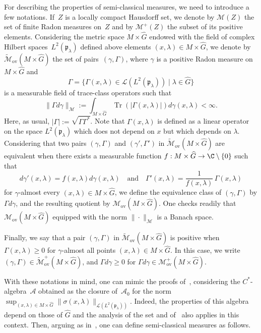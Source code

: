 \documentclass[JEP,XML,SOM,Unicode,published]{cedram}
\let\mathcal\mathscr
\let\sep\mid
\newcommand{\rov}{\mathrm{ov}}
\DeclareMathOperator{\Tr}{Tr}
\theoremstyle{plain}
\theoremstyle{definition}
\begin{document}
For describing the properties of semi-classical measures, we need to introduce a few notations.
If~$Z$ is a locally compact Hausdorff set, we denote by ${\mathcal M}(Z)$ the set of finite Radon measures on~$Z$ and by ${\mathcal M}^+(Z)$ the subset of its positive elements. Considering the metric space
$M\times \widehat G$ endowed with the field of complex Hilbert spaces~$L^2(\mathfrak p_\lambda)$ defined above elements $(x,\lambda)\in M\times \widehat G$, we denote by
$ \widetilde{\mathcal M}_{\rov}(M\times \widehat G) $
the set of pairs~$(\gamma,\Gamma)$, where $\gamma$ is a positive Radon measure on~$M\times \widehat G$ and
\[
\Gamma=\{\Gamma(x,\lambda)\in {\mathcal L}(L^2(\mathfrak p_\lambda))\sep\lambda \in \widehat G\}
\]
is a measurable field of trace-class operators
such that
\[
\|\Gamma d \gamma\|_{\mathcal M}:=
\int_{M\times \widehat G}\Tr(
|\Gamma(x,\lambda)|)d\gamma(x,\lambda)
<\infty.
\]
Here, as usual, $|\Gamma|:=\sqrt{\Gamma\Gamma^*}$. Note that $\Gamma(x,\lambda)$ is defined as a linear operator on the space $L^2(\mathfrak p_\lambda)$ which does not depend on $x$ but which depends on $\lambda$. Considering that 	
two pairs $(\gamma,\Gamma)$ and $(\gamma',\Gamma')$
in $\widetilde {\mathcal M}_{\rov}(M\times \widehat G)$
are {equivalent} when there exists a measurable function $f:M\times \widehat G\to \C\setminus\{0\}$ such that
\[
d\gamma'(x,\lambda) =f(x,\lambda) d\gamma(x,\lambda)\quad \text{and} \quad \Gamma'(x,\lambda)=\frac 1 {f(x,\lambda)}\, \Gamma(x,\lambda)
\]
for $\gamma$-almost every $(x,\lambda)\in M\times \widehat G $, we define the equivalence class of $(\gamma,\Gamma)$ by $\Gamma d \gamma$,
and the resulting quotient by ${\mathcal M}_{\rov}(M\times \widehat G)$. One checks readily that $\mathcal M_{\rov} (M\times\widehat G)$ equipped with the norm $\| \cdot\|_{{\mathcal M}}$ is a Banach space.

Finally, we say that
a pair $(\gamma,\Gamma)$
in $ \widetilde {\mathcal M}_{\rov}(M\times \widehat G)$
is positive when
$\Gamma(x,\lambda)\geq 0$ for $\gamma$-almost all points $(x,\lambda)\in M\times \widehat G$.
In this case, we write $(\gamma,\Gamma)\in \widetilde {\mathcal M}_{\rov}^+(M\times \widehat G)$,
and $\Gamma d\gamma \geq 0$ for $\Gamma d\gamma \in {\mathcal M}_{\rov}^+(M\times \widehat G)$.

With these notations in mind, one can mimic the proofs of~\cite{FF}, considering the $C^*$-algebra~$\mathcal A$ obtained as the closure of~$\mathcal A_0$ for the norm $\sup _{(x,\lambda)\in M\times \widehat G} \| \sigma(x,\lambda)\|_{\mathcal L(L^2(\mathfrak p_\lambda))}$. Indeed, the properties of this algebra depend on those of $\widehat G$ and the analysis of the set and of~\cite{FF1,FF} also applies in this context. Then, arguing as in~\cite{FF1,FF}, one can define semi-classical measures as follows.
\end{document}
